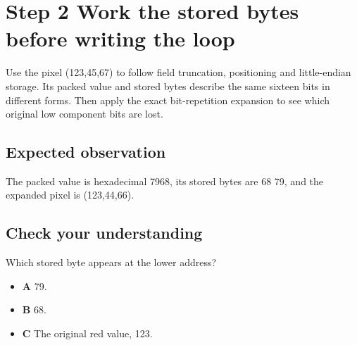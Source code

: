 \section{Step 2 Work the stored bytes before writing the loop}\label{rgb-s02}

Use the pixel (123,45,67) to follow field truncation, positioning and little-endian storage. Its packed value and stored bytes describe the same sixteen bits in different forms. Then apply the exact bit-repetition expansion to see which original low component bits are lost.

\subsection{Expected observation}
The packed value is hexadecimal 7968, its stored bytes are 68 79, and the expanded pixel is (123,44,66).

\subsection{Check your understanding}
Which stored byte appears at the lower address?

\begin{itemize}
  \item \textbf{A} 79.
  \item \textbf{B} 68.
  \item \textbf{C} The original red value, 123.
\end{itemize}
